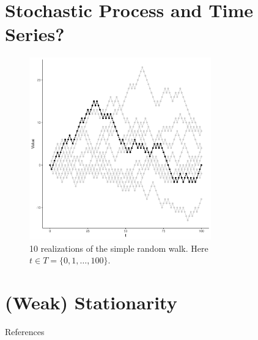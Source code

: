 \documentclass{beamer}
\begin{document}

\section{Stochastic Process and Time Series? \parencite{brockwell2009}}


\begin{frame}
  \begin{figure}
    \centering
    \includegraphics[width=0.7\textwidth, height=0.7\textwidth]{random_walk.jpg}
    \caption{10 realizations of the simple random walk. Here $t \in T = \{0, 1,
    \ldots, 100\}$.}
  \end{figure}
\end{frame}


\section{(Weak) Stationarity}


\begin{frame}[allowframebreaks]{References}
  \printbibliography
\end{frame}
\end{document}

